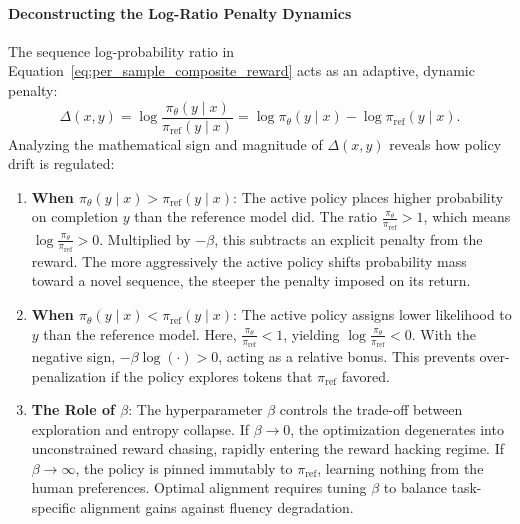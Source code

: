 \documentclass[../../../main.tex]{subfiles}
\begin{document}
\paragraph{Deconstructing the Log-Ratio Penalty Dynamics}
The sequence log-probability ratio in Equation~\eqref{eq:per_sample_composite_reward} acts as an adaptive, dynamic penalty:
\begin{equation}
\Delta(x, y) = \log \frac{\pi_\theta(y \mid x)}{\pi_{\text{ref}}(y \mid x)} = \log \pi_\theta(y \mid x) - \log \pi_{\text{ref}}(y \mid x).
\end{equation}
Analyzing the mathematical sign and magnitude of $\Delta(x, y)$ reveals how policy drift is regulated:
\begin{enumerate}
    \item \textbf{When $\pi_\theta(y \mid x) > \pi_{\text{ref}}(y \mid x)$}: The active policy places higher probability on completion $y$ than the reference model did. The ratio $\frac{\pi_\theta}{\pi_{\text{ref}}} > 1$, which means $\log \frac{\pi_\theta}{\pi_{\text{ref}}} > 0$. Multiplied by $-\beta$, this subtracts an explicit penalty from the reward. The more aggressively the active policy shifts probability mass toward a novel sequence, the steeper the penalty imposed on its return.
    \item \textbf{When $\pi_\theta(y \mid x) < \pi_{\text{ref}}(y \mid x)$}: The active policy assigns lower likelihood to $y$ than the reference model. Here, $\frac{\pi_\theta}{\pi_{\text{ref}}} < 1$, yielding $\log \frac{\pi_\theta}{\pi_{\text{ref}}} < 0$. With the negative sign, $-\beta \log(\cdot) > 0$, acting as a relative bonus. This prevents over-penalization if the policy explores tokens that $\pi_{\text{ref}}$ favored.
    \item \textbf{The Role of $\beta$}: The hyperparameter $\beta$ controls the trade-off between exploration and entropy collapse. If $\beta \to 0$, the optimization degenerates into unconstrained reward chasing, rapidly entering the reward hacking regime. If $\beta \to \infty$, the policy is pinned immutably to $\pi_{\text{ref}}$, learning nothing from the human preferences. Optimal alignment requires tuning $\beta$ to balance task-specific alignment gains against fluency degradation.
\end{enumerate}
\end{document}
